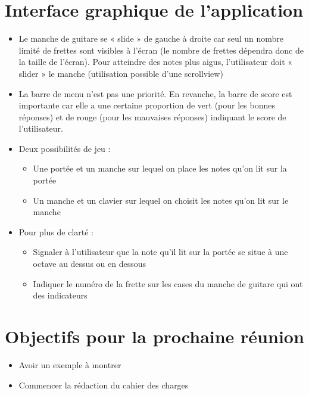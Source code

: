 \documentclass{scrartcl}
\begin{document}
\section{Interface graphique de l'application}
\begin{itemize}

  \item Le manche de guitare se « slide » de gauche à droite car seul un nombre limité de frettes sont visibles à l'écran (le nombre de frettes dépendra donc de la taille de l'écran). Pour atteindre des notes plus aigus, l'utilisateur doit « slider » le manche (utilisation possible d'une scrollview)
  
  \item La barre de menu n'est pas une priorité. En revanche, la barre de score est importante car elle a une certaine proportion de vert (pour les bonnes réponses) et de rouge (pour les mauvaises réponses) indiquant le score de l'utilisateur.

  \item Deux possibilités de jeu :
	\begin{itemize}
		\item Une portée et un manche sur lequel on place les notes qu'on lit sur la portée
		\item Un manche et un clavier sur lequel on choisit les notes qu'on lit sur le manche
	\end{itemize}
  \item Pour plus de clarté :
    \begin{itemize}
    \item Signaler à l'utilisateur que la note qu'il lit sur la portée se situe à une octave au dessus ou en dessous 
    \item Indiquer le numéro de la frette sur les cases du manche de guitare qui ont des indicateurs
	\end{itemize}
\end{itemize}

\section{Objectifs pour la prochaine réunion}
\begin{itemize}
  \item Avoir un exemple à montrer 
  \item Commencer la rédaction du cahier des charges
\end{itemize}
\end{document}
